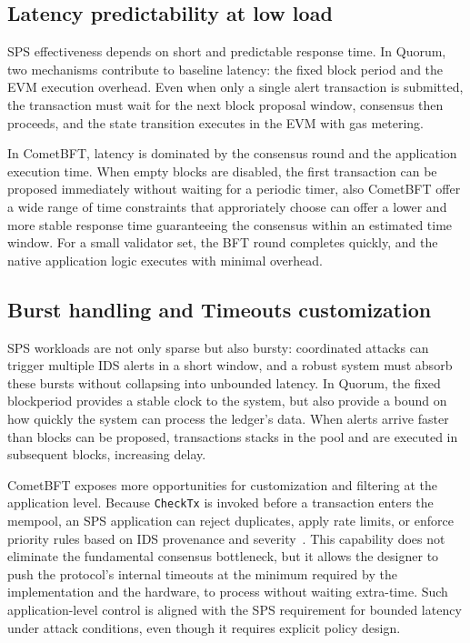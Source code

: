 \subsection{Latency predictability at low load}
SPS effectiveness depends on short and predictable response time. In Quorum, two mechanisms contribute to baseline latency: the fixed block period and the EVM execution overhead. Even when only a single alert transaction is submitted, the transaction must wait for the next block proposal window, consensus then proceeds, and the state transition executes in the EVM with gas metering.

In CometBFT, latency is dominated by the consensus round and the application execution time. When empty blocks are disabled, the first transaction can be proposed immediately without waiting for a periodic timer, also CometBFT offer a wide range of time constraints that approriately choose can offer a lower and more stable response time guaranteeing the consensus within an estimated time window. For a small validator set, the BFT round completes quickly, and the native application logic executes with minimal overhead.


\subsection{Burst handling and Timeouts customization}
SPS workloads are not only sparse but also bursty: coordinated attacks can trigger multiple IDS alerts in a short window, and a robust system must absorb these bursts without collapsing into unbounded latency. In Quorum, the fixed blockperiod provides a stable clock to the system, but also provide a bound on how quickly the system can process the ledger's data. When alerts arrive faster than blocks can be proposed, transactions stacks in the pool and are executed in subsequent blocks, increasing delay.

CometBFT exposes more opportunities for customization and filtering at the application level. Because \texttt{CheckTx} is invoked before a transaction enters the mempool, an SPS application can reject duplicates, apply rate limits, or enforce priority rules based on IDS provenance and severity~\cite{abciOverview}. This capability does not eliminate the fundamental consensus bottleneck, but it allows the designer to push the protocol's internal timeouts at the minimum required by the implementation and the hardware, to process without waiting extra-time. Such application-level control is aligned with the SPS requirement for bounded latency under attack conditions, even though it requires explicit policy design.

